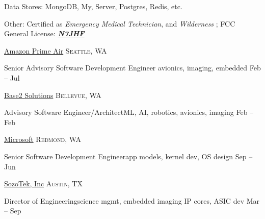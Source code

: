\documentclass[10pt,letterpaper]{article}
\begin{document}
\vspace{0.5em}\inlineheadsection
{Data Stores:}
{MongoDB,  My,   Server, Postgres, Redis, etc.}

\vspace{0.5em}\inlineheadsection
{Other:}
{Certified as \emph{Emergency Medical Technician}, and \emph{Wilderness }; {FCC General License: {\href{https://wireless2.fcc.gov/UlsApp/UlsSearch/license.jsp?licKey=3095481}{\emph{\textbf{N7JHF}}}}}}

\vspace{1em}\spacedhrule{0.5em}{-0.4em}


	\headedsection
	{\href{https://amazon.com/}{Amazon Prime Air}}
	{\textsc{Seattle, WA}} {%
	
	\headedsubsection
	{Senior Advisory Software Development Engineer \sbull\textsf{avionics, imaging, embedded}}
	{Feb  -- Jul }
	{}	
	}

\vspace*{1em}

	\headedsection
	{\href{https://base2s.com/}{Base2 Solutions}}
	{\textsc{Bellevue, WA}} {%
		
		\headedsubsection
		{Advisory Software Engineer/Architect\sbull\textsf{ML, AI, robotics, avionics, imaging}}
		{Feb  -- Feb }
		{}	
	}
	
	\vspace*{1em}

	\headedsection
	{\href{https://www.microsoft.com/en-us/}{Microsoft}}
	{\textsc{Redmond, WA}} {%
	
		\headedsubsection
		{Senior Software Development Engineer\sbull\textsf{app models, kernel dev, OS design}}
		{Sep  -- Jun }
		{}	
	}
		
	\vspace*{1em}
	
	\headedsection
	{\href{http://www.zoominfo.com/c/SozoTek-Inc/53446018}{SozoTek, Inc}}
	{\textsc{Austin, TX}} {%
		
		\headedsubsection
		{Director of Engineering\sbull\textsf{science mgmt, embedded imaging IP cores, ASIC dev}}
		{Mar  -- Sep }
			
	}
\end{document}
